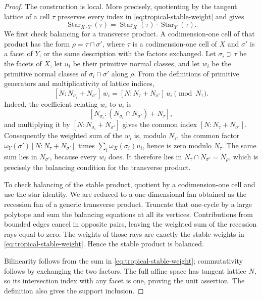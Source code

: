\begin{proof}
The construction is local.  More precisely, quotienting by the tangent
lattice of a cell $\tau$ preserves every index in
\eqref{eq:tropical-stable-weight} and gives
\[
 \operatorname{Star}_{X\cdot Y}(\tau)
 =\operatorname{Star}_X(\tau)\cdot\operatorname{Star}_Y(\tau).
\]
We first check balancing for a transverse product.  A codimension-one cell of
that product has the form $\rho=\tau\cap\sigma'$, where $\tau$ is a
codimension-one cell of $X$ and $\sigma'$ is a facet of $Y$, or the same
description with the factors exchanged.  Let $\sigma_i\supset\tau$ be the
facets of $X$, let $u_i$ be their primitive normal classes, and let $w_i$ be
the primitive normal classes of
$\sigma_i\cap\sigma'$ along $\rho$.  From the definitions of primitive
generators and multiplicativity of lattice indices,
\[
 [N:N_{\sigma_i}+N_{\sigma'}]\,w_i
 =[N:N_\tau+N_{\sigma'}]\,u_i
 \pmod {N_\tau}.
\]
Indeed, the coefficient relating $w_i$ to $u_i$ is
\[
 [N_{\sigma_i}:
   (N_{\sigma_i}\cap N_{\sigma'})+N_\tau],
\]
and multiplying it by $[N:N_{\sigma_i}+N_{\sigma'}]$ gives the common index
$[N:N_\tau+N_{\sigma'}]$.  Consequently the weighted sum of the $w_i$ is,
modulo $N_\tau$, the common factor
$\omega_Y(\sigma')[N:N_\tau+N_{\sigma'}]$ times
$\sum_i\omega_X(\sigma_i)u_i$, hence is zero modulo $N_\tau$.  The same sum
lies in $N_{\sigma'}$, because every $w_i$ does.  It therefore lies in
$N_\tau\cap N_{\sigma'}=N_\rho$, which is precisely the balancing condition
for the transverse product.

To check balancing of the stable product, quotient by a codimension-one cell
and use the star identity.  We are reduced to a one-dimensional fan obtained
as the recession fan of a generic transverse product.  Truncate that
one-cycle by a large polytope and sum the balancing equations at all its
vertices.  Contributions from bounded edges cancel in opposite pairs,
leaving the weighted sum of the recession rays equal to zero.  The weights
of those rays are exactly the stable weights in
\eqref{eq:tropical-stable-weight}.  Hence the stable product is balanced.

Bilinearity follows from the sum in
\eqref{eq:tropical-stable-weight}; commutativity follows by exchanging the
two factors.  The full affine space has tangent lattice $N$, so its
intersection index with any facet is one, proving the unit assertion.
The definition also gives the support inclusion.


\end{proof}
